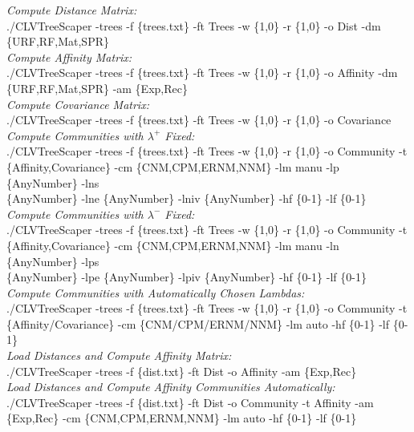 \documentclass[11pt]{article}
\begin{document}
\begin{enumerate}[{\bf (1)}]
{\it Compute Distance Matrix:} \\
./CLVTreeScaper -trees -f \{trees.txt\} -ft Trees -w \{1,0\} -r \{1,0\} -o Dist -dm \{URF,RF,Mat,SPR\} \\


{\it Compute Affinity Matrix:} \\
./CLVTreeScaper -trees -f \{trees.txt\} -ft Trees -w \{1,0\} -r \{1,0\} -o Affinity -dm \\
\{URF,RF,Mat,SPR\} -am \{Exp,Rec\} \\


{\it Compute Covariance Matrix:} \\
./CLVTreeScaper -trees -f \{trees.txt\} -ft Trees -w \{1,0\} -r \{1,0\} -o Covariance \\


{\it Compute Communities with $\lambda^{+}$ Fixed:} \\
./CLVTreeScaper -trees -f \{trees.txt\} -ft Trees -w \{1,0\} -r \{1,0\} -o Community -t \\
\{Affinity,Covariance\} -cm \{CNM,CPM,ERNM,NNM\} -lm manu -lp \{AnyNumber\} -lns \\
 \{AnyNumber\} -lne \{AnyNumber\} -lniv \{AnyNumber\} -hf \{0-1\} -lf \{0-1\} \\


{\it Compute Communities with $\lambda^{-}$ Fixed:} \\
./CLVTreeScaper -trees -f \{trees.txt\} -ft Trees -w \{1,0\} -r \{1,0\} -o Community -t \\
\{Affinity,Covariance\} -cm \{CNM,CPM,ERNM,NNM\} -lm manu -ln \{AnyNumber\} -lps \\
\{AnyNumber\} -lpe \{AnyNumber\} -lpiv \{AnyNumber\} -hf \{0-1\} -lf \{0-1\} \\


{\it Compute Communities with Automatically Chosen Lambdas:} \\
./CLVTreeScaper -trees -f \{trees.txt\} -ft Trees -w \{1,0\} -r \{1,0\} -o Community -t \\
\{Affinity/Covariance\} -cm \{CNM/CPM/ERNM/NNM\} -lm auto -hf \{0-1\} -lf \{0-1\} \\


{\it Load Distances and Compute Affinity Matrix:} \\
./CLVTreeScaper -trees -f \{dist.txt\} -ft Dist -o Affinity -am \{Exp,Rec\} \\


{\it Load Distances and Compute Affinity Communities Automatically:} \\
./CLVTreeScaper -trees -f \{dist.txt\} -ft Dist -o Community -t Affinity -am \{Exp,Rec\} -cm
\{CNM,CPM,ERNM,NNM\} -lm auto -hf \{0-1\} -lf \{0-1\} \\



\end{enumerate}
\end{document}
